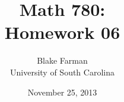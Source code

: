 \documentclass[10pt]{amsart}
\author{Blake Farman\\University of South Carolina}
\title{Math 780:\\Homework 06}
\date{November 25, 2013}
\begin{document}
\maketitle

\providecommand{\p}{\mathfrak{p}}
\providecommand{\m}{\mathfrak{m}}

\newtheorem{thm}{}
\newtheorem{lem}{Lemma}

%  
\end{document}
